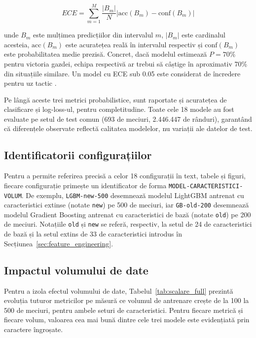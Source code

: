 \begin{equation}
    ECE = \sum_{m=1}^{M} \frac{|B_m|}{N}
    \left| \text{acc}(B_m) - \text{conf}(B_m) \right|
\end{equation}

unde $B_m$ este mulțimea predicțiilor din intervalul $m$, $|B_m|$ este
cardinalul acesteia, $\text{acc}(B_m)$ este acuratețea reală în intervalul
respectiv și $\text{conf}(B_m)$ este probabilitatea medie prezisă. Concret,
dacă modelul estimează $P = 70\%$ pentru victoria gazdei, echipa
respectivă ar trebui să câștige în aproximativ 70\% din situațiile
similare. Un model cu ECE sub 0.05 este considerat de încredere pentru uz
tactic \cite{Robberechts2019}.

Pe lângă aceste trei metrici probabilistice, sunt raportate și acuratețea
de clasificare și log-loss-ul, pentru completitudine. Toate cele 18 modele
au fost evaluate pe setul de test comun (693 de meciuri, 2.446.447 de
rânduri), garantând că diferențele observate reflectă calitatea modelelor,
nu variații ale datelor de test.

\subsection{Identificatorii configurațiilor}

Pentru a permite referirea precisă a celor 18 configurații în text, tabele
și figuri, fiecare configurație primește un identificator de forma
\texttt{MODEL-CARACTERISTICI-VOLUM}. De exemplu, \texttt{LGBM-new-500}
desemnează modelul LightGBM antrenat cu caracteristici extinse (notate
\texttt{new}) pe 500 de meciuri, iar \texttt{GB-old-200} desemnează modelul
Gradient Boosting antrenat cu caracteristici de bază (notate \texttt{old})
pe 200 de meciuri. Notațiile \texttt{old} și \texttt{new} se referă,
respectiv, la setul de 24 de caracteristici de bază și la setul extins de
33 de caracteristici introdus în Secțiunea~\ref{sec:feature_engineering}.

\subsection{Impactul volumului de date}

Pentru a izola efectul volumului de date, Tabelul~\ref{tab:scalare_full}
prezintă evoluția tuturor metricilor pe măsură ce volumul de antrenare
crește de la 100 la 500 de meciuri, pentru ambele seturi de
caracteristici. Pentru fiecare metrică și fiecare volum, valoarea cea mai
bună dintre cele trei modele este evidențiată prin caractere îngroșate.

